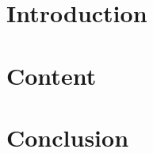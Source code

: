 \documentclass[twoside]{article}
\begin{document}
\Coverpage
\section{Introduction}\blindtext[1]\newpage
\section{Content}\blindmathpaper
\section{Conclusion}\blindtext[1]
\Affirmation
\end{document}
